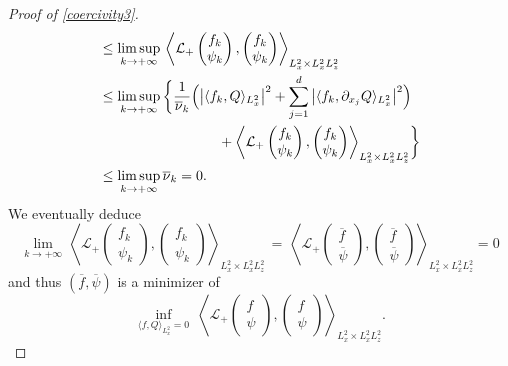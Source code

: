 \documentclass[JEP,XML,SOM,NoEqCountersInSection,NoFloatCountersInSection,Unicode,published]{cedram}
\let\bar\oldbar
\theoremstyle{definition}
\let\bar\overline
\newenvironment{ProofOf}[1]{\begin{proof}[Proof of #1]}{\end{proof}}
\begin{document}
\begin{ProofOf}{\eqref{coercivity3}}
\begin{align*}
&\leq\underset{k\to+\infty}{\limsup}\,\left\langle\mathcal{L}_{+}\begin{pmatrix} f_{k}\\\psi_{k} \end{pmatrix},\begin{pmatrix} f_{k}\\\psi_{k} \end{pmatrix}\right\rangle_{L_{x}^{2}\times L_{x}^{2}L_{z}^{2}}\\
&\leq\underset{k\to +\infty}{\limsup}\,\biggl\{\frac{1}{\bar{\nu}_{k}}\Bigl(\left|\langle f_{k},Q\rangle_{L_{x}^{2}}\right|^{2}
+\sum\limits_{j=1}^{d}\left|\langle f_{k},\partial_{x_{j}}Q\rangle_{L_{x}^{2}}\right|^{2}\Bigr)
\\
&\hspace*{3cm}+\left\langle\mathcal{L}_{+}\begin{pmatrix} f_{k}\\\psi_{k} \end{pmatrix},\begin{pmatrix} f_{k}\\\psi_{k} \end{pmatrix}\right\rangle_{L_{x}^{2}\times L_{x}^{2}L_{z}^{2}}\biggr\}\\
&\leq\underset{k\to+\infty}{\limsup}\,\bar{\nu}_{k}=0.
\end{align*}
We eventually deduce
\begin{equation}\label{cv_LL+}
\underset{k\to+\infty}{\lim}\,\left\langle\mathcal{L}_{+}\begin{pmatrix} f_{k}\\\psi_{k} \end{pmatrix},\begin{pmatrix} f_{k}\\\psi_{k} \end{pmatrix}\right\rangle_{L_{x}^{2}\times L_{x}^{2}L_{z}^{2}}\,=\, \left\langle\mathcal{L}_{+}\begin{pmatrix} \bar{f}\\\bar{\psi} \end{pmatrix},\begin{pmatrix} \bar{f}\\\bar{\psi} \end{pmatrix}\right\rangle_{L_{x}^{2}\times L_{x}^{2}L_{z}^{2}}=0
\end{equation}
and thus $(\bar{f},\bar{\psi})$ is a minimizer of
\begin{equation}\label{min_LL+}
\underset{\langle f,Q\rangle_{L_{x}^{2}}=0}{\inf}\;\left\langle\mathcal{L}_{+}\begin{pmatrix} f\\\psi \end{pmatrix},\begin{pmatrix} f\\\psi \end{pmatrix}\right\rangle_{L_{x}^{2}\times L_{x}^{2}L_{z}^{2}}.

\end{equation}
\end{ProofOf}
\end{document}
